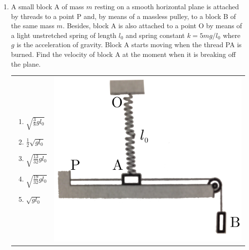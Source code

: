 \documentclass[12pt,letterpaper]{article}
\begin{document}
\begin{enumerate}[resume]
\item
A small block A of mass $m$ resting on a smooth horizontal plane is attached by threads to a point P and, by means of a massless pulley, to a block B of the same mass $m$. Besides, block A is also attached to a point O by means of a light unstretched spring of length $l_0$ and spring constant $k=5mg/l_0$ where $g$ is the acceleration of gravity. Block A starts moving when the thread PA is burned. Find the velocity of block A at the moment when it is breaking off the plane.

\begin{tabular}{l r}

\begin{minipage}{0.6\textwidth}
\begin{enumerate}
\item $\displaystyle \sqrt{\frac{3}{8}gl_0}$
\item $\displaystyle \frac{1}{2}\sqrt{gl_0}$
\item $\displaystyle \sqrt{\frac{13}{32}gl_0}$
\item $\displaystyle \sqrt{\frac{19}{32}gl_0}$
\item $\sqrt{gl_0}$
\end{enumerate}
\end{minipage} &
\begin{minipage}{0.3\textwidth}
\includegraphics[width=\textwidth]{thread.png}
\end{minipage}
\end{tabular}
\end{enumerate}
\end{document}
